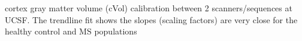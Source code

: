 \label{fig:hcms_GMV} cortex gray matter volume (cVol) calibration between 2 scanners/sequences at UCSF. The trendline fit shows the slopes (scaling factors) are very close for the healthy control and MS populations